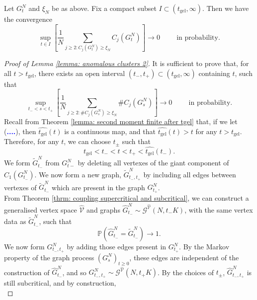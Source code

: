 \begin{lemma}\label{lemma: anomalous clusters 2}
       Let $G^N_t$ and $\xi_N$ be as above. Fix a compact subset $I\subset (t_\text{gel}, \infty)$. Then we have the convergence \begin{equation} \sup_{t \in I}\left[\frac{1}{N}\sum_{j\geq 2: C_j(G^N_t)\geq \xi_N} C_j(G^N_t)\right] \rightarrow 0 \hspace{1cm}\text{in probability.}\end{equation}
\end{lemma}
\begin{proof}[Proof of Lemma \ref{lemma: anomalous clusters 2}]  It is sufficient to prove that, for all $t>t_\text{gel}$, there exists an open interval $(t_-, t_+) \subset (t_\text{gel}, \infty)$ containing $t$, such that
\begin{equation}
    \sup_{t_-<s<t_+}\left[\frac{1}{N}\sum_{j\geq 2: \#C_j(G^N_s)\geq \xi_N} \#C_j(G^N_s)\right] \rightarrow 0 \hspace{1cm}\text{in probability.}
\end{equation} Recall from Theorem \ref{lemma: second moment finite after tgel} that, if we let (\textcolor{blue}{\textbf{....}}), then $\widehat{t_\text{gel}}(t)$ is a continuous map, and that $\widehat{t_\text{gel}}(t)>t$ for any $t>t_\text{gel}.$ Therefore, for any $t$, we can choose $t_\pm$ such that
\begin{equation}
    t_\text{gel}<t_-<t<t_+<\widehat{t_\text{gel}}(t_-).
\end{equation} We form $\widetilde{G}^N_{t_-}$ from $G^N_{t-}$ by deleting all vertexes of the giant component of $C_1(G^N_{t_-})$. We now form a new graph, $\widetilde{G}^N_{t_-,t_+}$ by including all edges between vertexes of $\widetilde{G}^N_{t_-}$ which are present in the graph $G^N_{t_+}$. \medskip \\ From Theorem \ref{thrm: coupling supercritical and subcritical}, we can construct a generalised vertex space $\widehat{\mathcal{V}}$ and graphs $\widehat{G}^N_{t_-}\sim \mathcal{G}^{\widehat{\mathcal{V}}}(N,t_-K)$, with the same vertex data as $\widetilde{G}^N_{t_-}$, such that \begin{equation}
    \mathbb{P}\left(\widehat{G}^N_{t_-}=\widetilde{G}^N_{t_-}\right)\rightarrow 1.
\end{equation} We now form $G^N_{t_-,t_+}$ by adding those edges present in $G^N_{t_+}$. By the Markov property of the graph process $(G^N_s)_{t\geq 0}$, these edges are independent of the construction of $\widehat{G}^N_{t_-}$, and so $G^N_{t_-,t_+}\sim \mathcal{G}^{\widehat{\mathcal{V}}}(N,t_+K)$. By the choices of $t_\pm$, $\widehat{G}^N_{t_-,t_+}$ is still subcritical, and by construction, \begin{equation}

\end{equation}
\end{proof}
